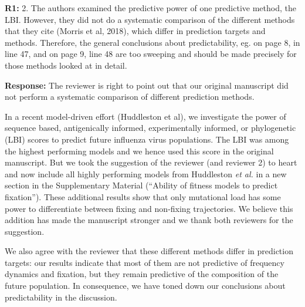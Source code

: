 \documentclass[aps,rmp,onecolumn]{revtex4-1}
\newcommand{\refa}[1]{\textbf{R1:} #1\vskip 5mm}
\newcommand{\response}[1]{{\it {\color{response}\textbf{Response:} #1}}\vskip 5mm}
\begin{document}

\refa{2. The authors examined the predictive power of one predictive
method, the LBI. However, they did not do a systematic comparison of
the different methods that they cite (Morris et al, 2018), which differ in prediction
targets and methods. Therefore, the general conclusions about
predictability, eg. on page 8, in line 47, and on page 9, line 48 are
too sweeping and should be made precisely for those methods looked at
in detail.}

\response{The reviewer is right to point out that our original manuscript did not perform a systematic comparison of different prediction methods.

In a recent model-driven effort (Huddleston et al), we investigate the power of sequence based, antigenically informed, experimentally informed, or phylogenetic (LBI) scores to predict future influenza virus populations.
The LBI was among the highest performing models and we hence used this score in the original manuscript.
But we took the suggestion of the reviewer (and reviewer 2) to heart and now include all highly performing models from Huddleston \emph{et al.} in a new section in the Supplementary Material (``Ability of fitness models to predict fixation'').
These additional results show that only mutational load has some power to differentiate between fixing and non-fixing trajectories.
We believe this addition has made the manuscript stronger and we thank both reviewers for the suggestion.

We also agree with the reviewer that these different methods differ in prediction targets: our results indicate that most of them are not predictive of frequency dynamics and fixation, but they remain predictive of the composition of the future population.
In consequence, we have toned down our conclusions about predictability in the discussion.}
\end{document}
